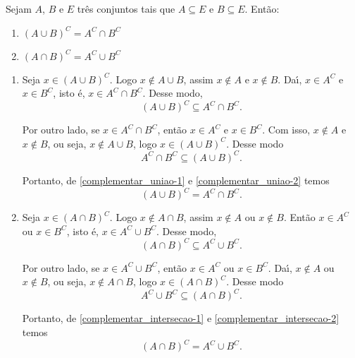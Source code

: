 \begin{proposicao} Sejam $A$, $B$ e $E$ tr{\^e}s conjuntos tais que $A\subseteq E$ e $B\subseteq E$. Ent{\~a}o:
\begin{enumerate}[label={\roman*})]
    \item $(A\cup B)^C = A^C\cap B^C$
    \item $(A\cap B)^C = A^C\cup B^C$
\end{enumerate}
\end{proposicao}
\begin{prova}
    \begin{enumerate}[label={\roman*})]
        \item Seja $x \in (A\cup B)^C$. Logo $x\notin A\cup B$, assim $x\notin A$ e $x\notin B$. Da{\'\i}, $x\in A^C$ e $x\in B^C$, isto {\'e}, $x\in A^C\cap B^C$. Desse modo,
        \begin{equation}\label{complementar_uniao-1}
            (A\cup B)^C \subseteq A^C\cap B^C.
        \end{equation}

        Por outro lado, se $x\in A^C\cap B^C$, ent{\~a}o $x\in A^C$ e $x\in B^C$. Com isso, $x\notin A$ e $x\notin B$, ou seja, $x\notin A\cup B$, logo $x\in (A\cup B)^C$. Desse modo
        \begin{equation}\label{complementar_uniao-2}
            A^C\cap B^C\subseteq(A\cup B)^C.
        \end{equation}

        Portanto, de \eqref{complementar_uniao-1} e \eqref{complementar_uniao-2} temos
        \[
            (A\cup B)^C = A^C\cap B^C.
        \]

        \item Seja $x \in (A\cap B)^C$. Logo $x\notin A\cap B$, assim $x\notin A$ ou $x\notin B$. Ent\~ao $x\in A^C$ ou $x\in B^C$, isto {\'e}, $x\in A^C\cup B^C$. Desse modo,
        \begin{equation}\label{complementar_intersecao-1}
            (A\cap B)^C \subseteq A^C\cup B^C.
        \end{equation}

        Por outro lado, se $x\in A^C\cup B^C$, ent{\~a}o $x\in A^C$ ou $x\in B^C$. Da{\'\i}, $x\notin A$ ou $x\notin B$, ou seja, $x\notin A\cap B$, logo $x\in (A\cap B)^C$. Desse modo
        \begin{equation}\label{complementar_intersecao-2}
            A^C\cup B^C\subseteq(A\cap B)^C.
        \end{equation}

        Portanto, de \eqref{complementar_intersecao-1} e \eqref{complementar_intersecao-2} temos
        \[
            (A\cap B)^C = A^C\cup B^C.
        \]
    \end{enumerate}
\end{prova}

